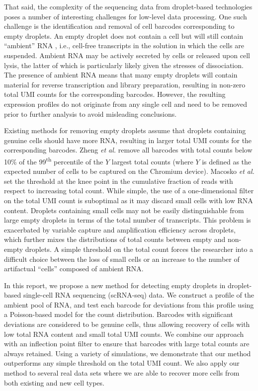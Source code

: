 \documentclass[10pt,letterpaper]{article}
\begin{document}
That said, the complexity of the sequencing data from droplet-based technologies poses a number of interesting challenges for low-level data processing.
One such challenge is the identification and removal of cell barcodes corresponding to empty droplets.
An empty droplet does not contain a cell but will still contain ``ambient'' RNA \cite{macosko2015highly}, i.e., cell-free transcripts in the solution in which the cells are suspended.
Ambient RNA may be actively secreted by cells or released upon cell lysis, the latter of which is particularly likely given the stresses of dissociation.
The presence of ambient RNA means that many empty droplets will contain material for reverse transcription and library preparation, resulting in non-zero total UMI counts for the corresponding barcodes.
However, the resulting expression profiles do not originate from any single cell and need to be removed prior to further analysis to avoid misleading conclusions.

Existing methods for removing empty droplets assume that droplets containing genuine cells should have more RNA, resulting in larger total UMI counts for the corresponding barcodes.
Zheng \textit{et al.} \cite{zheng2017massively} remove all barcodes with total counts below 10\% of the 99\textsuperscript{th} percentile of the $Y$ largest total counts (where $Y$ is defined as the expected number of cells to be captured on the Chromium device).
Macosko \textit{et al.} \cite{macosko2015highly} set the threshold at the knee point in the cumulative fraction of reads with respect to increasing total count.
While simple, the use of a one-dimensional filter on the total UMI count is suboptimal as it may discard small cells with low RNA content.
Droplets containing small cells may not be easily distinguishable from large empty droplets in terms of the total number of transcripts.
This problem is exacerbated by variable capture and amplification efficiency across droplets, which further mixes the distributions of total counts between empty and non-empty droplets.
A simple threshold on the total count forces the researcher into a difficult choice between the loss of small cells or an increase to the number of artifactual ``cells'' composed of ambient RNA.

In this report, we propose a new method for detecting empty droplets in droplet-based single-cell RNA sequencing (scRNA-seq) data.
We construct a profile of the ambient pool of RNA, and test each barcode for deviations from this profile using a Poisson-based model for the count distribution.
Barcodes with significant deviations are considered to be genuine cells, thus allowing recovery of cells with low total RNA content and small total UMI counts.
We combine our approach with an inflection point filter to ensure that barcodes with large total counts are always retained.
Using a variety of simulations, we demonstrate that our method outperforms any simple threshold on the total UMI count.
We also apply our method to several real data sets where we are able to recover more cells from both existing and new cell types.
\end{document}
